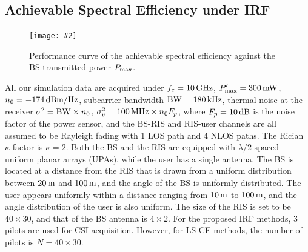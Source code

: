 \documentclass[journal,twocolumn]{IEEEtran}
\theoremstyle{nonumberplain}
\newcommand{\myincludegraphics}[2][width=1\linewidth]{\texttt{[image: \#2]}}
\newcommand{\myincludegraphics}[2][width=0.8\linewidth]{\texttt{[image: \#2]}}
\begin{document}
\subsection{Achievable Spectral Efficiency under IRF} \label{Achievable Spectral Efficiency under IRF}
    \begin{figure}[!t]
        \centering
        \myincludegraphics{data/rate-all.pdf}
        \caption{Performance curve of the achievable spectral efficiency against the BS transmitted power $P_{\rm max}$.}
        \label{fig:rate}
    \end{figure}
    All our simulation data are acquired under $f_c = 10\,{\rm GHz}$, $P_{\rm max}'=300 \,{\rm mW}$, $n_0=-174\,{\rm dBm/Hz}$, subcarrier bandwidth ${\rm BW} = 180\,{\rm kHz}$, thermal noise at the receiver $\sigma^2 = {\rm BW}\times n_0$, $\sigma_v^2=100\,{\rm MHz}\times n_0 F_p$, where $F_p=10\,{\rm dB}$ is the noise factor of the power sensor, and the BS-RIS and RIS-user channels are all assumed to be Rayleigh fading with 1 \ac{LOS} path and 4 \ac{NLOS} paths. 
    The Rician $\kappa$-factor is $\kappa=2$. 
    Both the BS and the RIS are equipped with $\lambda/2$-spaced uniform planar arrays (UPAs), while the user has a single antenna. 
    The BS is located at a distance from the RIS that is drawn from a uniform distribution between $20\,{\rm m}$ and $100\,{\rm m}$, and the angle of the BS is uniformly distributed. 
    The user appears uniformly within a distance ranging from $10\,{\rm m}$ to $100\,{\rm m}$, and the angle distribution of the user is also uniform. 
    The size of the RIS is set to be $40\times 30$, and that of the BS antenna is $4\times 2$. 
    For the proposed IRF methods, 3 pilots are used for CSI acquisition. 
    However, for LS-CE methods, the number of pilots is $N=40\times 30$. 
\end{document}
